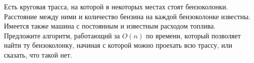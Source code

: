 \documentclass{article}
\begin{document}
Есть круговая трасса, на которой в некоторых местах стоят бензоколонки. Расстояние между ними и количество бензина 
на каждой бензоколонке известны. Имеется также машина с постоянным и известным расходом топлива. Предложите алгоритм, работающий за $O(n)$ по времени, который позволяет найти ту бензоколонку, начиная с которой можно проехать всю трассу, или сказать, что такой нет.
\end{document}
